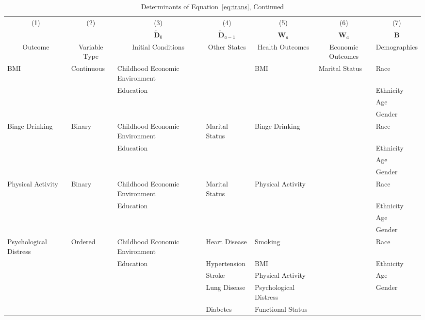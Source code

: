 \begin{table}
\caption{Determinants of Equation~\eqref{eq:trans}, Continued} \label{table:supertab2}
\begin{scriptsize}
\begin{tabular}{lllllll}
\toprule 
\multicolumn{1}{c}{(1)} & \multicolumn{1}{c}{(2)} & \multicolumn{1}{c}{(3)} & \multicolumn{1}{c}{(4)} & \multicolumn{1}{c}{(5)} & \multicolumn{1}{c}{(6)} & \multicolumn{1}{c}{(7)} \\
 & &  \multicolumn{1}{c}{$\tilde{\bm{D}}_0$} &  \multicolumn{1}{c}{$\tilde{\bm{D}}_{a-1}$} & \multicolumn{1}{c}{ $\bm{W}_a$ } &  \multicolumn{1}{c}{ $\bm{W}_a$ } &  \multicolumn{1}{c}{$\bm{B}$} \\ 
\multicolumn{1}{c}{Outcome} & \multicolumn{1}{c}{Variable Type} & \multicolumn{1}{c}{Initial Conditions} & \multicolumn{1}{c}{Other States} & \multicolumn{1}{c}{Health Outcomes} & \multicolumn{1}{c}{Economic Outcomes} & \multicolumn{1}{c}{Demographics} \\
\midrule
BMI & Continuous & Childhood Economic Environment & & BMI & Marital Status & Race \\
& & Education & & & & Ethnicity \\
 & &  & & & & Age \\
 &  & & & & & Gender \\
\midrule
Binge Drinking & Binary & Childhood Economic Environment &  Marital Status & Binge Drinking & & Race \\
 & & Education &  &  & & Ethnicity \\
  & &  &  &  & & Age \\
  &  & &  &  & & Gender \\
\midrule
Physical Activity & Binary & Childhood Economic Environment & Marital Status & Physical Activity & & Race \\
 & & Education &  & & & Ethnicity \\
  & &  &  &  & & Age \\
  &  & &  &  & & Gender \\
\midrule
Psychological Distress & Ordered & Childhood Economic Environment & Heart Disease & Smoking & & Race \\
 & & Education & Hypertension & BMI & & Ethnicity \\
 &  &  & Stroke & Physical Activity & & Age \\
   & & & Lung Disease & Psychological Distress & & Gender \\
    & & & Diabetes & Functional Status & & \\

\end{tabular}
\end{scriptsize}
\end{table}
